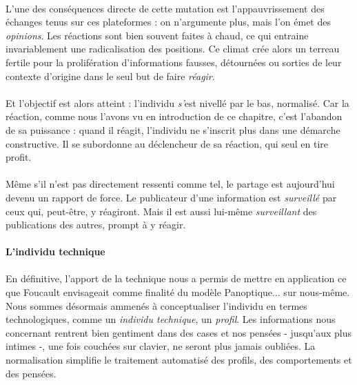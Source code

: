 \paragraph{} L'une des conséquences directe de cette mutation est l'appauvrissement des échanges tenus sur ces plateformes :
on n'argumente plus, mais l'on émet des \emph{opinions}. Les réactions sont bien souvent faites à chaud, ce qui entraine
invariablement une radicalisation des positions. Ce climat crée alors un terreau fertile pour la prolifération d'informations
fausses, détournées ou sorties de leur contexte d'origine dans le seul but de faire \emph{réagir}.

\paragraph{} Et l'objectif est alors atteint : l'individu \emph{s'}est nivellé par le bas, normalisé. Car la réaction,
comme nous l'avons vu en introduction de ce chapitre, c'est l'abandon de sa puissance : quand il réagit, l'individu
ne s'inscrit plus dans une démarche constructive. Il se subordonne au déclencheur de sa réaction, qui seul en tire profit.

\paragraph{} Même s'il n'est pas directement ressenti comme tel, le partage est aujourd'hui devenu un rapport de force. 
Le publicateur d'une information est \emph{surveillé} par ceux qui, peut-être, y réagiront. Mais il est aussi lui-même
\emph{surveillant} des publications des autres, prompt à y réagir. 


\paragraph{L'individu technique}

\paragraph{} En définitive, l'apport de la technique nous a permis de mettre en application ce que Foucault envisageait
comme finalité du modèle Panoptique... sur nous-même. Nous sommes désormais ammenés à conceptualiser l'individu en termes
technologiques, comme un \emph{individu technique}, un \emph{profil}. Les informations nous concernant rentrent bien
gentiment dans des cases et nos pensées - jusqu'aux plus intimes -, une fois couchées sur clavier, ne seront plus jamais oubliées.
La normalisation simplifie le traitement automatisé des profils, des comportements et des pensées.

